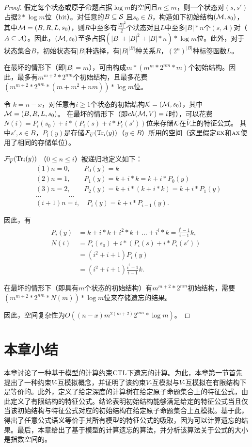 \begin{proof}
假定每个状态或原子命题占据$\log m$的空间且$n\leq m$，则一个状态对$(s,s')$占据$2*\log m$位（bit）。对任意的$B \subseteq {\cal S}$ 且$s_0\in B$，构造如下初始结构$({\cal M},s_0)$，其中${\cal M} = (B,R,L,s_0)$，则$R$中至多有$\frac{|B|^2}{2}$个状态对且$L$中至多$|B|*n$个$(s,A)$对（$A\subseteq {\cal A}$）。因此，$({\cal M},s_0)$至多占据$(|B|+|B|^2+|B|*n)*\log m$位。此外，对于状态集合$B$，初始状态有$|B|$种选择，有$|B|^{|B|}$种关系$R$，$(2^n)^{|B|}$种标签函数$L$。

在最坏的情形下（即$|B|=m$），可由构成$m * (m^m * 2^{nm} * m)$个初始结构。因此，最多有$m^{m+2} * 2^{nm}$个初始结构，且最多花费$(m^{m+2} * 2^{nm} * (m + m^2 + nm))* \log m$位。

令 $k = n-x$，对任意有$i\geq 1$个状态的初始结构${\cal K} = ({\cal M},s_0)$，其中${\cal M} = (B,R,L,s_0)$。
在最坏的情形下（即$ch({\cal M},V) = i$时），可以花费$N(i) = P_i(s_0) + i * (P_i(s) + i *P_i(s'))$位来存储${\cal K}$在$\overline{V}$上的特征公式。
其中$s',s\in B$，$P_i(y)$是存储${\cal F}_{\overline{V}}(\textrm{Tr}_i(y))$（$y\in B$）所用的空间（这里假定$\textsc{e}\textsc{x}$和$\textsc{a}\textsc{x}$使用了相同的存储单位）。

${\cal F}_{\overline{V}}(\textrm{Tr}_i(y))$ （$0\leq n \leq i$）被递归地定义如下：
\begin{align*}
	&(1) n=0,  \qquad P_0(y) = k\\
	&(2) n=1, \qquad  P_1(y) = k + i*k = k + i*P_0(y)\\
	&(3) n=2, \qquad P_2(y) = k + i*(k + i*k) = k+i*P_1(y)\\
	& \dots \qquad \qquad \dots\\
	&(i+1) n = i, \quad P_i(y) = k + i * P_{i-1}(y).
\end{align*}

因此，有
\begin{align*}
	P_i(y) & = k + i*k + i^2 * k + \dots + i^i * k = \frac{i^i -1}{i-1} k,\\
	N(i) & = P_i(s_0) + i* (P_i(s) + i * P_i(s'))\\
	& = (i^2 + i +1) P_i(y) \\
	& = (i^2 + i+1)\frac{i^i -1}{i-1} k.
\end{align*}
	
在最坏的情形下（即具有$m$个状态的初始结构）有$m^{m+2} * 2^{nm}$初始结构，需要$(m^{m+2} * 2^{nm} * N(m)) * \log m$位来存储遗忘的结果。

因此，空间复杂性为$O((n-x)m^{2(m+2)}2^{nm}* \log m)$。
\end{proof}


\section{本章小结}\label{sec:chapter05-conclusion}
本章讨论了一种基于模型的计算约束$\textrm{CTL}$下遗忘的计算。为此，本章第一节首先提出了一种约束$V$-互模拟概念，并证明了该约束$V$-互模拟与$V$-互模拟在有限结构下是等价的。此外，定义了给定深度的计算树在给定原子命题集合上的特征公式，由此定义了有限结构的特征公式。结论表明初始结构能够满足给定的特征公式当且仅当该初始结构与特征公式对应的初始结构在给定原子命题集合上互模拟。基于此，得出了任意公式语义等价于其所有模型的特征公式的吸取，因为可以计算遗忘的结果。最后，本章给出了基于模型的计算遗忘的算法，并分析该算法关于公式的大小是指数空间的。


